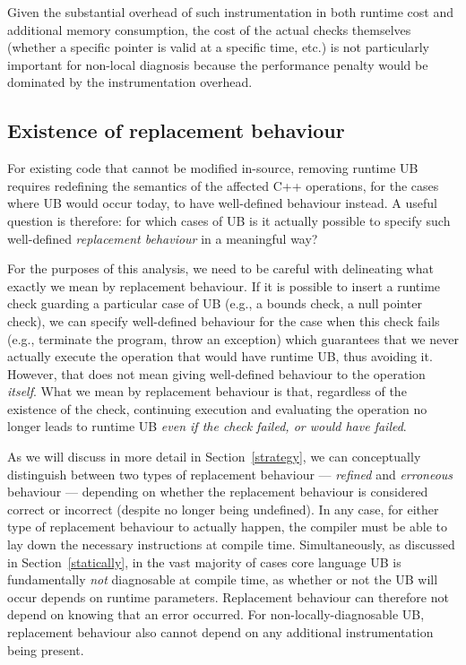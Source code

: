 {Given the substantial overhead of such instrumentation in both runtime cost and additional memory consumption, the cost of the actual checks themselves (whether a specific pointer is valid at a specific time, etc.) is not particularly important for non-local diagnosis because the performance penalty would be dominated by the instrumentation overhead.

\subsection{Existence of replacement behaviour}
\label{replacement}

For existing code that cannot be modified in-source, removing runtime UB requires redefining 
the semantics of the affected C++ operations, for the cases where UB would occur today, to have well-defined behaviour instead. A useful question is therefore: for which cases of UB is it actually possible to  specify such well-defined \emph{replacement behaviour} in a meaningful way?

For the purposes of this analysis, we need to be careful with delineating what exactly we mean by replacement behaviour. If it is possible to insert a runtime check guarding a particular case of UB (e.g., a bounds check, a null pointer check), we can specify well-defined behaviour for the case when this check fails (e.g., terminate the program, throw an exception) which guarantees that we never actually execute the operation that would have runtime UB, thus avoiding it. However, that does not mean giving well-defined behaviour to the operation \emph{itself}. What we mean by replacement behaviour is that, regardless of the existence of the check, continuing execution and evaluating the operation no longer leads to runtime UB \emph{even if the check failed, or would have failed}.

As we will discuss in more detail in Section~\ref{strategy}, we can conceptually distinguish between two types of replacement behaviour --- \emph{refined} and \emph{erroneous} behaviour --- depending on whether the replacement behaviour is considered correct or incorrect (despite no longer being undefined). In any case, for either type of replacement behaviour to actually happen, the compiler must be able to lay down the necessary instructions at compile time. Simultaneously, as discussed in Section~\ref{statically}, in the vast majority of cases core language UB is fundamentally \emph{not} diagnosable at compile time, as whether or not the UB will occur depends on runtime parameters. Replacement behaviour can therefore not depend on knowing that an error occurred. For non-locally-diagnosable UB, replacement behaviour also cannot depend on any additional instrumentation being present.

}
